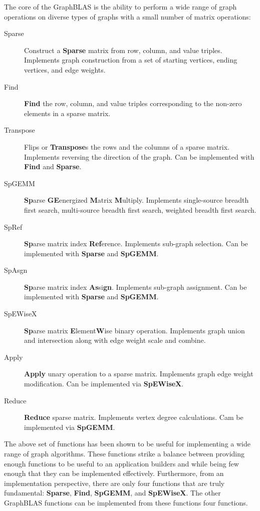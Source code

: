 The core of the GraphBLAS is the ability to perform a wide range of graph operations on diverse types of graphs with a small number of matrix operations:
\begin{description}
\item[Sparse] Construct a {\bf Sparse} matrix from row, column, and value triples.  Implements graph construction from a set of starting vertices, ending vertices, and edge weights.
\item[Find] {\bf Find} the row, column, and value triples corresponding to the non-zero elements in a sparse matrix.
\item[Transpose] Flips or {\bf Transpose}s the rows and the columns of a sparse matrix.  Implements reversing the direction of the graph.  Can be implemented with  {\bf Find} and {\bf Sparse}.
\item[SpGEMM] {\bf Sp}arse {\bf GE}energized {\bf M}atrix {\bf M}ultiply.   Implements single-source breadth first search, multi-source breadth first search, weighted breadth first search.
\item[SpRef] {\bf Sp}arse matrix index {\bf Ref}erence. Implements sub-graph selection.  Can be implemented with {\bf Sparse} and {\bf SpGEMM}.
\item[SpAsgn] {\bf Sp}arse matrix index {\bf As}si{\bf gn}.  Implements sub-graph assignment.  Can be implemented with {\bf Sparse} and {\bf SpGEMM}.
\item[SpEWiseX] {\bf Sp}arse matrix {\bf E}lement{\bf W}ise binary operation. Implements graph union and intersection along with edge weight scale and combine.
\item[Apply] {\bf Apply} unary operation to a sparse matrix.  Implements graph edge weight modification.  Can be implemented via {\bf SpEWiseX}.
\item[Reduce] {\bf Reduce} sparse matrix.  Implements vertex degree calculations.  Cam be implemented via {\bf SpGEMM}.
\end{description}
The above set of functions has been shown to be useful for implementing a wide range of graph algorithms.  These functions strike a balance between providing enough functions to be useful to an application builders and while being few enough that they can be implemented effectively.  Furthermore, from an implementation perspective, there are only four functions that are truly fundamental: {\bf Sparse}, {\bf Find}, {\bf SpGEMM}, and {\bf SpEWiseX}.  The other GraphBLAS functions can be implemented from these functions four functions.


